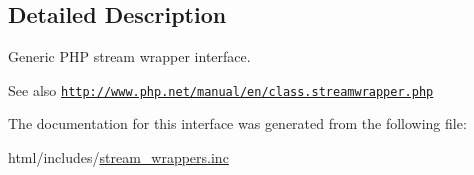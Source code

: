 \subsection{Detailed Description}
Generic PHP stream wrapper interface.

\begin{DoxySeeAlso}{See also}
\href{http://www.php.net/manual/en/class.streamwrapper.php}{\tt http://www.php.net/manual/en/class.streamwrapper.php} 
\end{DoxySeeAlso}


The documentation for this interface was generated from the following file:\begin{DoxyCompactItemize}
\item 
html/includes/\hyperlink{stream__wrappers_8inc}{stream\_\-wrappers.inc}\end{DoxyCompactItemize}
